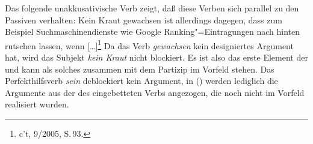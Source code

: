 \noindent
Das folgende unakkusativische Verb zeigt, daß diese Verben sich parallel zu den Passiven verhalten:
\ea
Kein Kraut gewachsen ist allerdings dagegen, dass zum Beispiel Suchmaschinendienste wie Google Ranking"=Eintragungen
nach hinten rutschen lassen, wenn [\ldots]\footnote{
c't, 9/2005, S.\,93.
}
\z
Da das Verb \emph{gewachsen} kein designiertes Argument hat, wird das Subjekt \emph{kein Kraut} nicht blockiert.
Es ist also das erste Element der \subcatl und kann als solches zusammen mit dem Partizip im Vorfeld stehen.
Das Perfekthilfsverb \emph{sein} deblockiert kein Argument, in () werden lediglich die Argumente aus der \subcatl
des eingebetteten Verbs angezogen, die noch nicht im Vorfeld realisiert wurden.






